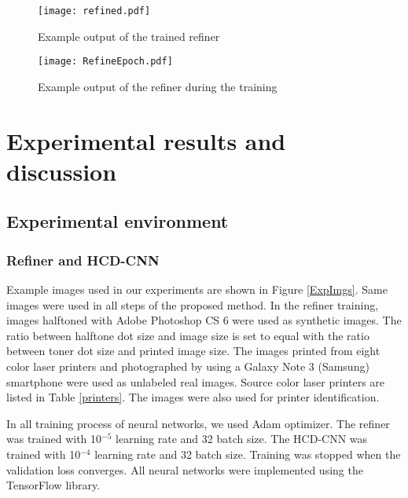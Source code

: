 \documentclass[5p, times]{elsarticle}
\begin{document}
\begin{figure*}[t!]
    \centerline{\texttt{[image: refined.pdf]}}
    \caption{Example output of the trained refiner
    } \label{Refined}
\end{figure*}

\begin{figure*}[t!]
    \centerline{\texttt{[image: RefineEpoch.pdf]}}
    \caption{Example output of the refiner during the training
    } \label{RefineEpoch}
\end{figure*}

\section{Experimental results and discussion}
\subsection{Experimental environment}
\subsubsection{Refiner and HCD-CNN}

Example images used in our experiments are shown in Figure \ref{ExpImgs}. Same images were used in all steps of the proposed method. In the refiner training, images halftoned with Adobe Photoshop CS 6 were used as synthetic images. The ratio between halftone dot size and image size is set to equal with the ratio between toner dot size and printed image size. The images printed from eight color laser printers and photographed by using a Galaxy Note 3 (Samsung) smartphone were used as unlabeled real images. Source color laser printers are listed in Table \ref{printers}. The images were also used for printer identification.

In all training process of neural networks, we used Adam optimizer. The refiner was trained with 10$^{-5}$ learning rate and 32 batch size. The HCD-CNN was trained with 10$^{-4}$ learning rate and 32 batch size. Training was stopped when the validation loss converges. All neural networks were implemented using the TensorFlow \cite{tf} library.
\end{document}
